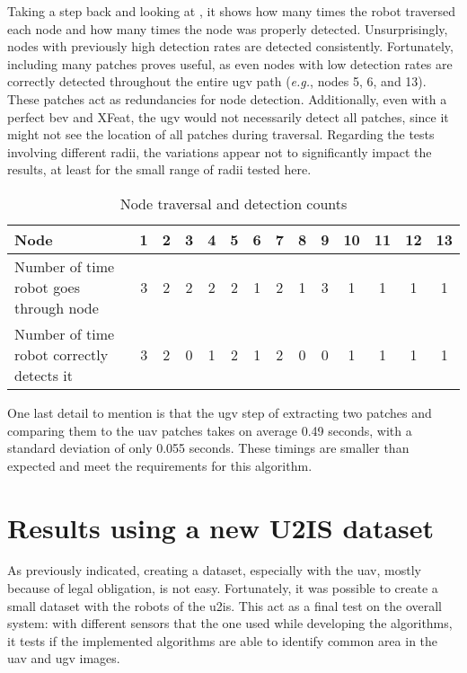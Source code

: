 Taking a step back and looking at , it shows how many times the robot traversed
each node and how many times the node was properly detected.
Unsurprisingly, nodes with previously high detection rates are detected consistently.
Fortunately, including many patches proves useful, as even nodes with low detection rates are correctly
detected throughout the entire \gls{ugv} path (\textit{e.g.}, nodes 5, 6, and 13).
These patches act as redundancies for node detection.
Additionally, even with a perfect \gls{bev} and XFeat, the \gls{ugv} would not necessarily detect all patches, since it
might not see the location of all patches during traversal.
Regarding the tests involving different radii, the variations appear not to significantly impact the results, at least for
the small range of radii tested here.

\begin{table}[ht]
    \centering
    \begin{tabular}{|>{\raggedright\arraybackslash}p{3cm}|c|c|c|c|c|c|c|c|c|c|c|c|c|}
        \hline
        Node                                      & 1 & 2 & 3 & 4 & 5 & 6 & 7 & 8 & 9 & 10 & 11 & 12 & 13 \\ \hline
        Number of time robot goes through node    & 3 & 2 & 2 & 2 & 2 & 1 & 2 & 1 & 3 & 1  & 1  & 1  & 1  \\ \hline
        Number of time robot correctly detects it & 3 & 2 & 0 & 1 & 2 & 1 & 2 & 0 & 0 & 1  & 1  & 1  & 1  \\ \hline
    \end{tabular}
    \caption{Node traversal and detection counts}
    \label{tab:montmorency:node_detection}
\end{table}

One last detail to mention is that the \gls{ugv} step of extracting two patches and comparing them to the \gls{uav}
patches takes on average 0.49 seconds, with a standard deviation of only 0.055 seconds.
These timings are smaller than expected and meet the requirements for this algorithm.



\section{Results using a new U2IS dataset}

As previously indicated, creating a dataset, especially with the \gls{uav}, mostly because of legal obligation, is not easy.
Fortunately, it was possible to create a small dataset with the robots of the \gls{u2is}.
This act as a final test on the overall system: with different sensors that the one used while developing the algorithms, it tests if the
implemented algorithms are able to identify common area in the \gls{uav} and \gls{ugv} images.

